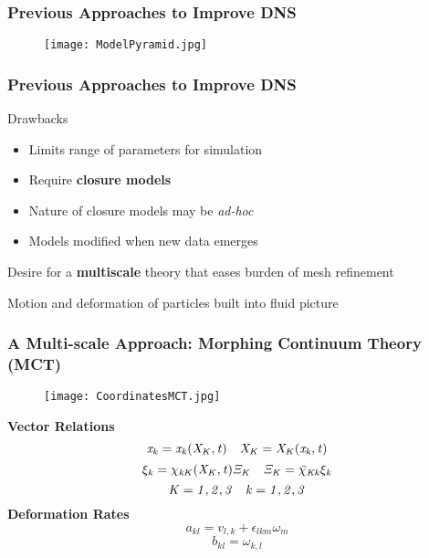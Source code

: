 \documentclass{beamer}
\begin{document}
\begin{frame}
\frametitle{Previous Approaches to Improve DNS}
 \begin{figure}
  \texttt{[image: ModelPyramid.jpg]}
 \end{figure}
\end{frame}
\begin{frame}
 \frametitle{Previous Approaches to Improve DNS}
 \Large
 Drawbacks
 \pause
 \begin{itemize}
  \item Limits range of parameters for simulation
  \item Require \textbf{closure models}
  \item Nature of closure models may be \textit{ad-hoc}
  \item Models modified when new data emerges
 \end{itemize}
 \vspace{5mm}
 \pause
 Desire for a \textbf{multiscale} theory that eases burden of mesh refinement
\end{frame}

\begin{frame}
\Large
Motion and deformation of particles built into fluid picture
\frametitle{A Multi-scale Approach: Morphing Continuum Theory (MCT)}
\begin{multicols}{2}
\begin{figure}
\texttt{[image: CoordinatesMCT.jpg]}
\end{figure}
\large
\textbf{Vector Relations}
\begin{equation*} %
\centering
{\it x_{k} = x_{k} (X_{K},t)}
\quad
{\it  X_{K} = X_{K} (x_{k},t)}
\end{equation*}
\begin{equation*} %
\centering
{\it \xi_{k} = \chi_{kK}(X_{K},t)\Xi_{K}}
\quad
{\it \Xi_{K} =  \bar{\chi}_{Kk}\xi_{k}}
\end{equation*}
\begin{equation*} %
\centering
{\it K = 1, 2, 3} 
\quad
{\it  k = 1, 2, 3 }
\end{equation*}
\textbf{Deformation Rates}
\begin{equation*}
 a_{kl}  = v_{l,k} + \epsilon_{lkm}\omega_{m}
\end{equation*}
\begin{equation*}
 b_{kl} = \omega_{k,l}
\end{equation*}
\end{multicols}
\end{frame}
\end{document}
